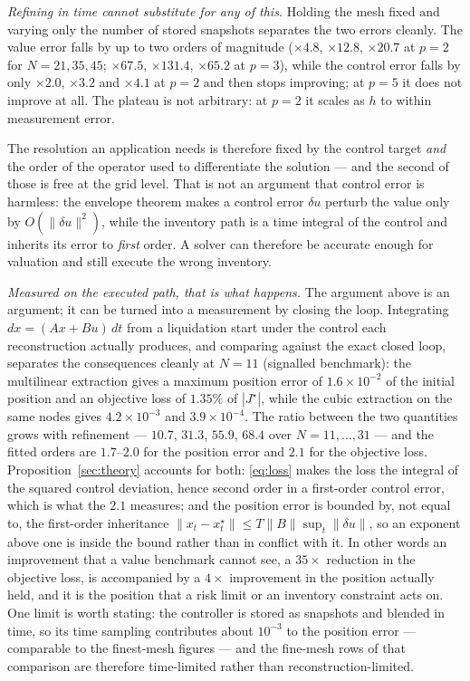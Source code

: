 \documentclass[conference]{IEEEtran}
\begin{document}
\emph{Refining in time cannot substitute for any of this.} Holding the mesh fixed and varying only
the number of stored snapshots separates the two errors cleanly. The value error falls by up to two
orders of magnitude ($\times4.8$, $\times12.8$, $\times20.7$ at $p=2$ for $N=21,35,45$;
$\times67.5$, $\times131.4$, $\times65.2$ at $p=3$), while the control error falls by only
$\times2.0$, $\times3.2$ and $\times4.1$ at $p=2$ and then stops improving; at $p=5$ it does not
improve at all. The plateau is not arbitrary: at $p=2$ it scales as $h$ to within measurement
error.

The resolution an application needs is therefore fixed by the control target \emph{and} the order of
the operator used to differentiate the solution --- and the second of those is free at the grid
level. That is not an argument that control error is harmless: the envelope theorem makes a control
error $\delta u$ perturb the value only by $O(\|\delta u\|^2)$, while the inventory path is a time
integral of the control and inherits its error to \emph{first} order. A solver can therefore be
accurate enough for valuation and still execute the wrong inventory.

\emph{Measured on the executed path, that is what happens.} The argument above is an argument; it can
be turned into a measurement by closing the loop. Integrating $dx = (Ax + Bu)\,dt$ from a liquidation
start under the control each reconstruction actually produces, and comparing against the exact
closed loop, separates the consequences cleanly at $N=11$ (signalled benchmark): the multilinear
extraction gives a maximum position error of $1.6\times10^{-2}$ of the initial position and an
objective loss of $1.35\%$ of $|J^\star|$, while the cubic extraction on the same nodes gives
$4.2\times10^{-3}$ and $3.9\times10^{-4}$. The ratio between the two quantities grows with refinement
--- $10.7$, $31.3$, $55.9$, $68.4$ over $N = 11,\dots,31$ --- and the fitted orders are $1.7$--$2.0$
for the position error and $2.1$ for the objective loss. Proposition~\ref{sec:theory} accounts for
both: \eqref{eq:loss} makes the loss the integral of the squared control deviation, hence second
order in a first-order control error, which is what the $2.1$ measures; and the position error is
bounded by, not equal to, the first-order inheritance $\|x_t - x_t^\star\| \le T\|B\|\sup_t\|\delta
u\|$, so an exponent above one is inside the bound rather than in conflict with it. In other words an
improvement that a value benchmark
cannot see, a $35\times$ reduction in the objective loss, is accompanied by a $4\times$ improvement
in the position actually held, and it is the position that a risk limit or an inventory constraint
acts on. One limit is worth stating: the controller is stored as snapshots and blended in time, so
its time sampling contributes about $10^{-3}$ to the position error --- comparable to the
finest-mesh figures --- and the fine-mesh rows of that comparison are therefore time-limited rather
than reconstruction-limited.
\end{document}
